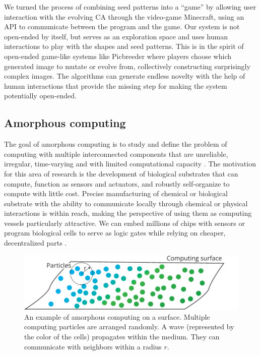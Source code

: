 We turned the process of combining seed patterns into a “game” by allowing user
interaction with the evolving CA through the video-game Minecraft, using an API
to communicate between the program and the game. Our system is not open-ended by
itself, but serves as an exploration space and uses human interactions to play
with the shapes and seed patterns. This is in the spirit of open-ended game-like
systems like Picbreeder \parencite{secretanPicbreederCaseStudy2011,
  woolleyDeleteriousEffectsPriori2011} where players choose which generated
image to mutate or evolve from, collectively constructing surprisingly complex
images. The algorithms can generate endless novelty with the help of human
interactions that provide the missing step for making the system potentially
open-ended.

\subsection{Amorphous computing}
The goal of amorphous computing is to study and define the problem of computing
with multiple interconnected components that are unreliable, irregular,
time-varying and with limited computational capacity
\parencite{abelsonAmorphousComputing2000}. The motivation for this area of
research is the development of biological substrates that can compute, function
as sensors and actuators, and robustly self-organize to compute with little
cost. Precise manufacturing of chemical or biological substrate with the ability
to communicate locally through chemical or physical interactions is within
reach, making the perspective of using them as computing vessels particularly
attractive. We can embed millions of chips with sensors
\parencite{abelsonAmorphousComputing2000} or program biological cells to serve
as logic gates \parencite{weissProgrammingBiologicalCells1998,
  weissVivoDigitalCircuits2002} while relying on cheaper, decentralized parts
\parencite{buteraProgrammingPaintableComputer2002}.

\begin{figure}[htbp]
  \centering
  \includegraphics[width=.8\linewidth]{figures/amorphous_computing}
  \caption{An example of amorphous computing on a surface. Multiple computing
    particles are arranged randomly. A wave (represented by the color of the
    cells) propagates within the medium. They can communicate with neighbors
    within a radius $r$.}
  \label{fig:amorphous_computing}
\end{figure}

